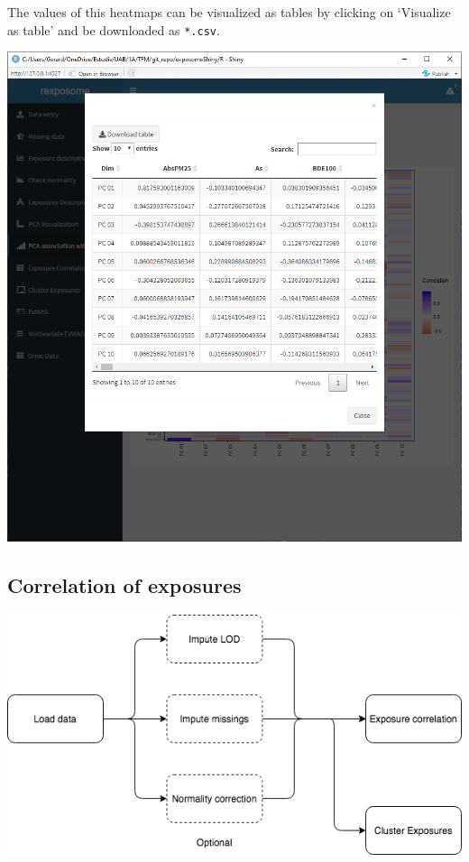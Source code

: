 \documentclass[
]{book}
\begin{document}
The values of this heatmaps can be visualized as tables by clicking on `Visualize as table' and be downloaded as \texttt{*.csv}.

\includegraphics{images/analysis5_3_2.png}

\hypertarget{correlation-of-exposures}{%
\subsection{Correlation of exposures}\label{correlation-of-exposures}}

\includegraphics{images/analysis6_1.png}
\end{document}
